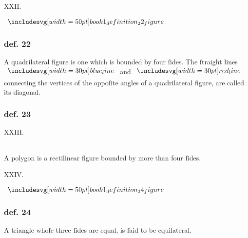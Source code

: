 \hfill

\begin{center}
  XXII.\label{book1def22}\\
\end{center}
\begin{minipage}{0.33\textwidth}
  \begin{center}
    $\img[0][0][50]{book1_definition_22_figure}$
  \end{center}
\end{minipage}%
\begin{minipage}{0.67\textwidth}
  \subsubsection{def. 22}
  \begin{center}
    \raggedright A quadrilateral figure is one which is bounded by four ſides. The ſtraight lines $\blueline$ and $\redline$ connecting the vertices of the oppoſite angles of a quadrilateral figure, are called its diagonal.
  \end{center}
\end{minipage}

\hfill

\begin{minipage}{0.1\textwidth}
  \phantom{}
\end{minipage}%
\begin{minipage}{0.8\textwidth}
  \subsubsection{def. 23}
  \begin{center}
    XXIII.\label{book1def23}\\
    \hfill\\
    \raggedright A polygon is a rectilinear figure bounded by more than four ſides.\\
  \end{center}
\end{minipage}%
\begin{minipage}{0.1\textwidth}
  \phantom{}
\end{minipage}%

\hfill

\begin{center}
  XXIV.\label{book1def24}\\
\end{center}
\begin{minipage}{0.33\textwidth}
  \begin{center}
    $\img[0][0][50]{book1_definition_24_figure}$
  \end{center}
\end{minipage}%
\begin{minipage}{0.67\textwidth}
  \subsubsection{def. 24}
  \begin{center}
    \raggedright A triangle whoſe three ſides are equal, is ſaid to be equilateral.
  \end{center}
\end{minipage}

